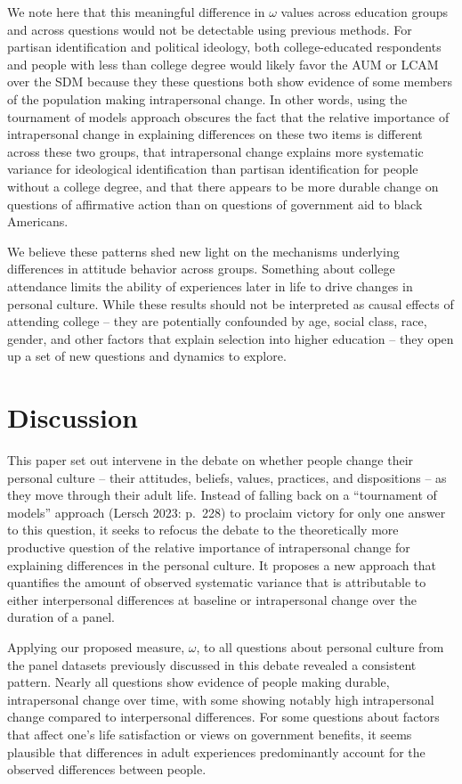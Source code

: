 \documentclass[
  12pt,
]{article}
\begin{document}
We note here that this meaningful difference in \(\omega\) values across
education groups and across questions would not be detectable using
previous methods. For partisan identification and political ideology,
both college-educated respondents and people with less than college
degree would likely favor the AUM or LCAM over the SDM because they
these questions both show evidence of some members of the population
making intrapersonal change. In other words, using the tournament of
models approach obscures the fact that the relative importance of
intrapersonal change in explaining differences on these two items is
different across these two groups, that intrapersonal change explains
more systematic variance for ideological identification than partisan
identification for people without a college degree, and that there
appears to be more durable change on questions of affirmative action
than on questions of government aid to black Americans.

We believe these patterns shed new light on the mechanisms underlying
differences in attitude behavior across groups. Something about college
attendance limits the ability of experiences later in life to drive
changes in personal culture. While these results should not be
interpreted as causal effects of attending college -- they are
potentially confounded by age, social class, race, gender, and other
factors that explain selection into higher education -- they open up a
set of new questions and dynamics to explore.

\hypertarget{discussion}{%
\section{Discussion}\label{discussion}}

This paper set out intervene in the debate on whether people change
their personal culture -- their attitudes, beliefs, values, practices,
and dispositions -- as they move through their adult life. Instead of
falling back on a ``tournament of models'' approach (Lersch 2023:
p.~228) to proclaim victory for only one answer to this question, it
seeks to refocus the debate to the theoretically more productive
question of the relative importance of intrapersonal change for
explaining differences in the personal culture. It proposes a new
approach that quantifies the amount of observed systematic variance that
is attributable to either interpersonal differences at baseline or
intrapersonal change over the duration of a panel.

Applying our proposed measure, \(\omega\), to all questions about
personal culture from the panel datasets previously discussed in this
debate revealed a consistent pattern. Nearly all questions show evidence
of people making durable, intrapersonal change over time, with some
showing notably high intrapersonal change compared to interpersonal
differences. For some questions about factors that affect one's life
satisfaction or views on government benefits, it seems plausible that
differences in adult experiences predominantly account for the observed
differences between people.
\end{document}
